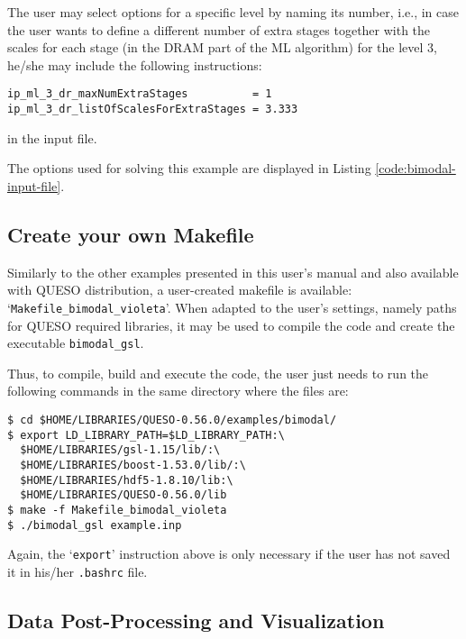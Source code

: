 The user may select options for a specific level by naming its number, i.e., in case the user wants to define a different number of extra stages together with the scales for each stage (in the DRAM part of the ML algorithm) for the level 3, he/she may include the following instructions:
\begin{lstlisting}
ip_ml_3_dr_maxNumExtraStages          = 1
ip_ml_3_dr_listOfScalesForExtraStages = 3.333
\end{lstlisting}
in the input file.


The options used for solving this example are displayed in Listing \ref{code:bimodal-input-file}.





\subsection{Create your own Makefile}\label{sec:bimodal-makefile}

Similarly to the other examples presented in this user's manual and also available with QUESO distribution, a user-created makefile is available: `\texttt{Makefile\_bimodal\_violeta}'. When adapted to the user's settings, namely paths for  QUESO required libraries, it may be used to compile the code and create the executable \verb+bimodal_gsl+.

Thus, to compile, build and execute the code, the user just needs to run the following commands in the same directory where the files are:
\begin{lstlisting}
$ cd $HOME/LIBRARIES/QUESO-0.56.0/examples/bimodal/
$ export LD_LIBRARY_PATH=$LD_LIBRARY_PATH:\
  $HOME/LIBRARIES/gsl-1.15/lib/:\
  $HOME/LIBRARIES/boost-1.53.0/lib/:\
  $HOME/LIBRARIES/hdf5-1.8.10/lib:\
  $HOME/LIBRARIES/QUESO-0.56.0/lib
$ make -f Makefile_bimodal_violeta
$ ./bimodal_gsl example.inp
\end{lstlisting}

Again, the `\verb+export+' instruction above is only necessary if the user has not saved it in his/her \verb+.bashrc+ file.


\subsection{Data Post-Processing and Visualization}\label{sec:bimodal-results}



